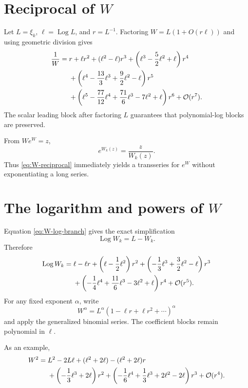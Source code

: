 \documentclass[11pt,openany]{book}
\theoremstyle{definition}
\theoremstyle{plain}
\theoremstyle{remark}
\newcommand{\bigO}{\mathcal{O}}
\DeclareMathOperator{\Log}{Log}
\begin{document}
\section{Reciprocal of \texorpdfstring{\(W\)}{W}}
Let \(L=\xi_k\), \(\ell=\Log L\), and \(r=L^{-1}\). Factoring \(W=L(1+O(r\ell))\) and using geometric division gives
\begin{align}
 \frac1W={}&r+\ell r^2+(\ell^2-\ell)r^3
 +\left(\ell^3-\frac52\ell^2+\ell\right)r^4\notag\\
 &+\left(\ell^4-\frac{13}{3}\ell^3+\frac92\ell^2-\ell\right)r^5\notag\\
 &+\left(\ell^5-\frac{77}{12}\ell^4+\frac{71}{6}\ell^3-7\ell^2+\ell\right)r^6
 +\bigO(r^7).
\label{eq:W-reciprocal}
\end{align}
The scalar leading block after factoring \(L\) guarantees that polynomial-log blocks are preserved.

From \(We^W=z\),
\begin{equation}\label{eq:expW}
 e^{W_k(z)}=\frac{z}{W_k(z)}.
\end{equation}
Thus \cref{eq:W-reciprocal} immediately yields a transseries for \(e^W\) without exponentiating a long series.

\section{The logarithm and powers of \texorpdfstring{\(W\)}{W}}
Equation \cref{eq:W-log-branch} gives the exact simplification
\begin{equation}\label{eq:logW-exact}
 \Log W_k=L-W_k.
\end{equation}
Therefore
\begin{align}
 \Log W_k={}&\ell-\ell r
 +\left(\ell-\frac12\ell^2\right)r^2
 +\left(-\frac13\ell^3+\frac32\ell^2-\ell\right)r^3\notag\\
 &+\left(-\frac14\ell^4+\frac{11}{6}\ell^3-3\ell^2+\ell\right)r^4
 +\bigO(r^5).
\label{eq:logW-series}
\end{align}
For any fixed exponent \(\alpha\), write
\[
 W^\alpha=L^\alpha\left(1-\ell r+\ell r^2+\cdots\right)^\alpha
\]
and apply the generalized binomial series. The coefficient blocks remain polynomial in \(\ell\).

As an example,
\begin{align}
 W^2={}&L^2-2L\ell+(\ell^2+2\ell)
 -(\ell^2+2\ell)r\notag\\
 &+\left(-\frac13\ell^3+2\ell\right)r^2
 +\left(-\frac16\ell^4+\frac13\ell^3+2\ell^2-2\ell\right)r^3
 +\bigO(r^4).
\label{eq:W-square}
\end{align}
\end{document}

